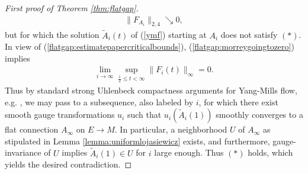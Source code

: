 \documentclass[12pt]{amsart}
\renewcommand{\1}{{\mathbf 1}}
\theoremstyle{others}
\numberwithin{equation}{section}
\begin{document}
\begin{proof}[First proof of Theorem \ref{thm:flatgap}]
\begin{align}
    \|F_{A_i}\|_{2, 4} \searrow 0, 
\end{align} but for which the solution \(\tilde{A}_i(t)\) of (\ref{ymf}) starting at \(A_i\) does not satisfy \((\ast)\). In view of (\ref{flatgap:estimatepapercriticalbounds}), (\ref{flatgap:morreygoingtozero}) implies 
\begin{align*}
    \lim_{i \to \infty} \sup_{\frac{1}{2} \leq t < \infty} \|F_i(t)\|_\infty = 0.
\end{align*} Thus by standard strong Uhlenbeck compactness arguments for Yang-Mills flow, e.g. \cite[Theorem 1.3]{waldronuhlenbeck}, we may pass to a subsequence, also labeled by \(i\), for which there exist smooth gauge transformations \(u_i\) such that \(u_i(\tilde{A}_i(1))\) smoothly converges to a flat connection \(A_\infty\) on $E \to M.$ In particular, a neighborhood \(U\) of $A_\infty$ as stipulated in Lemma \ref{lemma:uniformlojasiewicz} exists, and furthermore, gauge-invariance of \(U\) implies \(\tilde{A}_i(1) \in U\) for \(i\) large enough. Thus \((\ast)\) holds, which yields the desired contradiction. \par


\end{proof}
\end{document}
